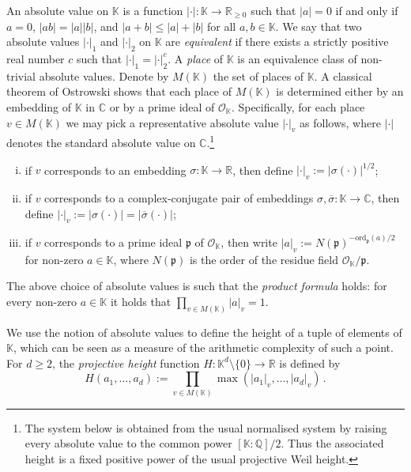\documentclass[a4paper,UKenglish,cleveref, autoref, thm-restate]{lipics-v2021}
\begin{document}
An absolute value on $\mathbb K$ is a function $|\cdot|:\mathbb K \rightarrow \mathbb R_{\geq 0}$
such that $|a|=0$ if and only if $a=0$, $|ab|=|a||b|$, and $|a+b|\leq |a|+|b|$ for all $a,b\in \mathbb K$.
We say that two absolute values $|\cdot|_1$ and $|\cdot|_2$ on
$\mathbb K$ are \emph{equivalent} if there exists a strictly positive real number $c$
such that $|\cdot|_1=|\cdot|_2^c$. A \emph{place} of $\mathbb K$
is an equivalence class of non-trivial absolute values.  Denote by $M(\mathbb K)$
the set of places of $\mathbb K$.  A classical theorem of Ostrowski shows that each place of $M(\mathbb K)$
is determined either by an embedding of
$\mathbb K$ in $\mathbb C$ or by a
prime ideal of $\mathcal O_{\mathbb K}$.   Specifically, for each place $v\in M(\mathbb K)$ we may
pick a representative absolute value $|\cdot|_v$ as follows, where $|\cdot|$ denotes the standard  absolute value on $\mathbb C$.\footnote{The system below is obtained from
the usual normalised system by raising every absolute value to the
common power \([\mathbb K:\mathbb Q]/2\).  Thus the associated height is
a fixed positive power of the usual projective Weil height.}
\begin{enumerate}[(i)]
    \item if $v$ corresponds to an embedding
$\sigma:\mathbb K\rightarrow \mathbb R$, then define
$|\cdot|_v := |\sigma(\cdot)|^{1/2}$; 
\item if $v$ corresponds to a
complex-conjugate pair of embeddings
$\sigma,\overline{\sigma}:\mathbb K \rightarrow \mathbb C$, then
define
$|\cdot|_v := |\sigma(\cdot)|=|\overline{\sigma}(\cdot)|$;
\item if $v$ corresponds to a prime ideal $\mathfrak p$ of
$\mathcal O_{\mathbb K}$, then write
$|a|_v := N(\mathfrak p)^{-\mathrm{ord}_{\mathfrak p}(a)/2}$ for non-zero
$a \in \mathbb K$, where $N(\mathfrak p)$ is the order of the residue field $\mathcal O_{\mathbb K}/\mathfrak p$.
\end{enumerate}
The above choice of absolute values is such that the \emph{product formula} holds:
for every non-zero
$a\in \mathbb K$ it holds that $\prod_{v \in M(\mathbb K)} |a|_v=1$.

We use the notion of absolute values to define the height of a tuple of elements of $\mathbb K$,
which can be seen as a measure of the arithmetic complexity of such a point.
For $d\geq 2$, the \emph{projective height} function $H:\mathbb K^d \setminus\{0\} \rightarrow\mathbb  R$
is defined by
\[  H(a_1,\ldots,a_d) := \prod_{v \in M(\mathbb K)}
\max(|a_1|_v,\ldots,|a_d|_v) \, .\]
\end{document}
